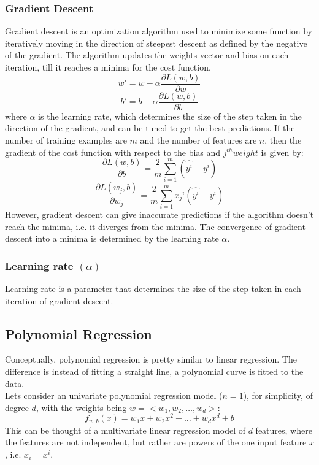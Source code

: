 \documentclass{article}
\begin{document}
\subsubsection*{Gradient Descent}
Gradient descent is an optimization algorithm used to minimize some function by iteratively moving in the direction of steepest descent as defined by the negative of the gradient. The algorithm updates the weights vector and bias on each iteration, till it reaches a minima for the cost function.
\begin{equation}
    w' = w - \alpha \frac{\partial L(w,b)}{\partial w}
\end{equation}
\begin{equation}
    b' = b - \alpha \frac{\partial L(w,b)}{\partial b}
\end{equation}
where $\alpha$ is the learning rate, which determines the size of the step taken in the direction of the gradient, and can be tuned to get the best predictions. 
If the number of training examples are $m$ and the number of features are $n$, then the gradient of the cost function with respect to the bias and $j^{th} weight$ is given by:
\begin{equation}
    \frac{\partial L(w,b)}{\partial b} = \frac{2}{m} \sum_{i=1}^{m} (\hat{y^i}-y^i)
\end{equation}
\begin{equation}
    \frac{\partial L(w_j,b)}{\partial w_j} = \frac{2}{m} \sum_{i=1}^{m} {x_j}^i(\hat{y^i}-y^i)
\end{equation}
However, gradient descent can give inaccurate predictions if the algorithm doesn't reach the minima, i.e. it diverges from the minima. The convergence of gradient descent into a minima is determined by the learning rate $\alpha$.

\subsubsection*{Learning rate $(\alpha)$}
Learning rate is a parameter that determines the size of the step taken in each iteration of gradient descent. 

\subsection{Polynomial Regression}
Conceptually, polynomial regression is pretty similar to linear regression. The difference is instead of fitting a straight line, a polynomial curve is fitted to the data.\\
Lets consider an univariate polynomial regression model ($n=1$), for simplicity, of degree $d$, with the weights being $w=<w_1,w_2,\dots,w_d>$:
\begin{equation}
    f_{w,b}(x) = w_1x + w_2x^2 + \dots + w_dx^d + b
\end{equation}
This can be thought of a multivariate linear regression model of $d$ features, where the features are not independent, but rather are powers of the one input feature $x$, i.e. $x_i=x^i$.\\
\end{document}
